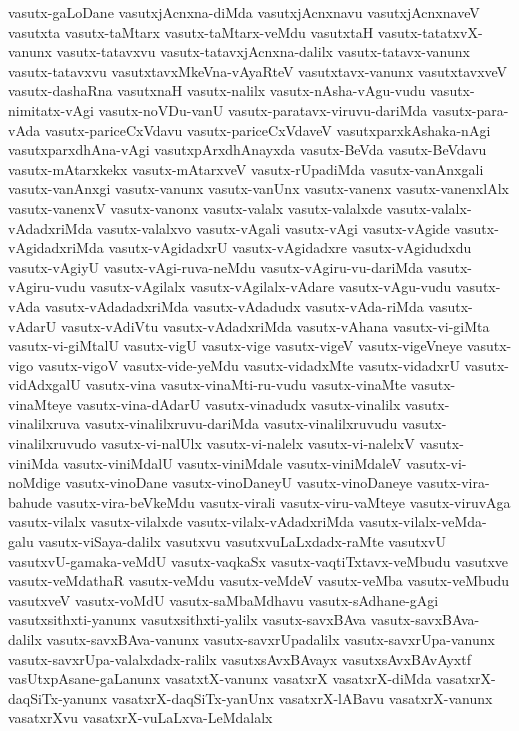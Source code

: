 {vasutx-gaLoDane
vasutxjAcnxna-diMda
vasutxjAcnxnavu
vasutxjAcnxnaveV
vasutxta
vasutx-taMtarx
vasutx-taMtarx-veMdu
vasutxtaH
vasutx-tatatxvX-vanunx
vasutx-tatavxvu
vasutx-tatavxjAcnxna-dalilx
vasutx-tatavx-vanunx
vasutx-tatavxvu
vasutxtavxMkeVna-vAyaRteV
vasutxtavx-vanunx
vasutxtavxveV
vasutx-dashaRna
vasutxnaH
vasutx-nalilx
vasutx-nAsha-vAgu-vudu
vasutx-nimitatx-vAgi
vasutx-noVDu-vanU
vasutx-paratavx-viruvu-dariMda
vasutx-para-vAda
vasutx-pariceCxVdavu
vasutx-pariceCxVdaveV
vasutxparxkAshaka-nAgi
vasutxparxdhAna-vAgi
vasutxpArxdhAnayxda
vasutx-BeVda
vasutx-BeVdavu
vasutx-mAtarxkekx
vasutx-mAtarxveV
vasutx-rUpadiMda
vasutx-vanAnxgali
vasutx-vanAnxgi
vasutx-vanunx
vasutx-vanUnx
vasutx-vanenx
vasutx-vanenxlAlx
vasutx-vanenxV
vasutx-vanonx
vasutx-valalx
vasutx-valalxde
vasutx-valalx-vAdadxriMda
vasutx-valalxvo
vasutx-vAgali
vasutx-vAgi
vasutx-vAgide
vasutx-vAgidadxriMda
vasutx-vAgidadxrU
vasutx-vAgidadxre
vasutx-vAgidudxdu
vasutx-vAgiyU
vasutx-vAgi-ruva-neMdu
vasutx-vAgiru-vu-dariMda
vasutx-vAgiru-vudu
vasutx-vAgilalx
vasutx-vAgilalx-vAdare
vasutx-vAgu-vudu
vasutx-vAda
vasutx-vAdadadxriMda
vasutx-vAdadudx
vasutx-vAda-riMda
vasutx-vAdarU
vasutx-vAdiVtu
vasutx-vAdadxriMda
vasutx-vAhana
vasutx-vi-giMta
vasutx-vi-giMtalU
vasutx-vigU
vasutx-vige
vasutx-vigeV
vasutx-vigeVneye
vasutx-vigo
vasutx-vigoV
vasutx-vide-yeMdu
vasutx-vidadxMte
vasutx-vidadxrU
vasutx-vidAdxgalU
vasutx-vina
vasutx-vinaMti-ru-vudu
vasutx-vinaMte
vasutx-vinaMteye
vasutx-vina-dAdarU
vasutx-vinadudx
vasutx-vinalilx
vasutx-vinalilxruva
vasutx-vinalilxruvu-dariMda
vasutx-vinalilxruvudu
vasutx-vinalilxruvudo
vasutx-vi-nalUlx
vasutx-vi-nalelx
vasutx-vi-nalelxV
vasutx-viniMda
vasutx-viniMdalU
vasutx-viniMdale
vasutx-viniMdaleV
vasutx-vi-noMdige
vasutx-vinoDane
vasutx-vinoDaneyU
vasutx-vinoDaneye
vasutx-vira-bahude
vasutx-vira-beVkeMdu
vasutx-virali
vasutx-viru-vaMteye
vasutx-viruvAga
vasutx-vilalx
vasutx-vilalxde
vasutx-vilalx-vAdadxriMda
vasutx-vilalx-veMda-galu
vasutx-viSaya-dalilx
vasutxvu
vasutxvuLaLxdadx-raMte
vasutxvU
vasutxvU-gamaka-veMdU
vasutx-vaqkaSx
vasutx-vaqtiTxtavx-veMbudu
vasutxve
vasutx-veMdathaR
vasutx-veMdu
vasutx-veMdeV
vasutx-veMba
vasutx-veMbudu
vasutxveV
vasutx-voMdU
vasutx-saMbaMdhavu
vasutx-sAdhane-gAgi
vasutxsithxti-yanunx
vasutxsithxti-yalilx
vasutx-savxBAva
vasutx-savxBAva-dalilx
vasutx-savxBAva-vanunx
vasutx-savxrUpadalilx
vasutx-savxrUpa-vanunx
vasutx-savxrUpa-valalxdadx-ralilx
vasutxsAvxBAvayx
vasutxsAvxBAvAyxtf
vasUtxpAsane-gaLanunx
vasatxtX-vanunx
vasatxrX
vasatxrX-diMda
vasatxrX-daqSiTx-yanunx
vasatxrX-daqSiTx-yanUnx
vasatxrX-lABavu
vasatxrX-vanunx
vasatxrXvu
vasatxrX-vuLaLxva-LeMdalalx
}
